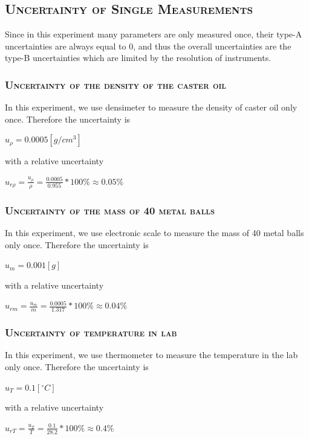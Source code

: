 \documentclass[a4paper,12pt]{article}
\begin{document}
\begin{appendices}
      \subsection{\textsc{Uncertainty of Single Measurements}}
      Since in this experiment many parameters are only measured once, their type-A uncertainties are always equal to 0, and thus the overall uncertainties are the type-B uncertainties which are limited by the resolution of instruments.
      \subsubsection{\textsc{Uncertainty of the density of the caster oil}}
      In this experiment, we use densimeter to measure the density of caster oil only once. Therefore the uncertainty is 
      \begin{center}
      $\displaystyle u_{\rho} = 0.0005 [g/cm^3]$
      \end{center}
      with a relative uncertainty 
      \begin{center}
      $\displaystyle u_{r\rho} = \frac{u_{\rho}}{\rho} = \frac{0.0005}{0.955} * 100\% \approx 0.05 \%$
      \end{center}
      \subsubsection{\textsc{Uncertainty of the mass of 40 metal balls}}
      In this experiment, we use electronic scale to measure the mass of 40 metal balls only once. Therefore the uncertainty is 
      \begin{center}
      $ \displaystyle u_{m} = 0.001 [g]$
      \end{center}
      with a relative uncertainty 
      \begin{center}
      $ \displaystyle u_{rm} = \frac{u_{m}}{m} = \frac{0.0005}{1.317} * 100\% \approx 0.04 \%$
      \end{center}
      \subsubsection{\textsc{Uncertainty of temperature in lab}}
      In this experiment, we use thermometer to measure the temperature in the lab only once. Therefore the uncertainty is 
      \begin{center}
      $ \displaystyle u_{T} = 0.1 [^{\circ}C]$
      \end{center}
      with a relative uncertainty 
      \begin{center}
      $ \displaystyle u_{rT} = \frac{u_{T}}{T} = \frac{0.1}{28.2} * 100\% \approx 0.4 \%$
      \end{center}

\end{appendices}
\end{document}
